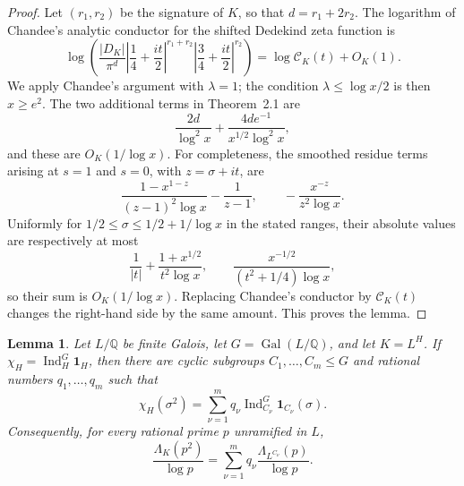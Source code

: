 \documentclass[twoside,reqno,11pt,a4paper]{amsart}
\numberwithin{equation}{section}
\theoremstyle{plain}
\newtheorem{lem}[thm]{Lemma}
\theoremstyle{definition}
\theoremstyle{remark}
\DeclareMathOperator{\Gal}{Gal}
\renewcommand{\le}{\leqslant}
\renewcommand{\ge}{\geqslant}
\begin{document}
\begin{proof}
Let $(r_1,r_2)$ be the signature of $K$, so that $d=r_1+2r_2$.  The logarithm of Chandee's analytic conductor for the shifted Dedekind zeta function is
\begin{equation*}
\log\left(\frac{|D_K|}{\pi^d}
\left|\frac14+\frac{it}{2}\right|^{r_1+r_2}
\left|\frac34+\frac{it}{2}\right|^{r_2}\right)
=\log\mathcal C_K(t)+O_K(1).
\end{equation*}
We apply Chandee's argument \cite[Theorem~2.1 and Section~3]{Chandee} with $\lambda=1$; the condition $\lambda\le\log x/2$ is then $x\ge e^2$.  The two additional terms in Theorem~2.1 are
\begin{equation*}
\frac{2d}{\log^2x}+\frac{4de^{-1}}{x^{1/2}\log^2x},
\end{equation*}
and these are $O_K(1/\log x)$.  For completeness, the smoothed residue terms arising at $s=1$ and $s=0$, with $z=\sigma+it$, are
\begin{equation*}
\frac{1-x^{1-z}}{(z-1)^2\log x}-\frac1{z-1},
\qquad -\frac{x^{-z}}{z^2\log x}.
\end{equation*}
Uniformly for $1/2\le\sigma\le1/2+1/\log x$ in the stated ranges, their absolute values are respectively at most
\begin{equation*}
\frac1{|t|}+\frac{1+x^{1/2}}{t^2\log x},
\qquad \frac{x^{-1/2}}{(t^2+1/4)\log x},
\end{equation*}
so their sum is $O_K(1/\log x)$.  Replacing Chandee's conductor by $\mathcal C_K(t)$ changes the right-hand side by the same amount.  This proves the lemma.
\end{proof}
\begin{lem}\label{artin-square-coefficients}
Let $L/\mathbb Q$ be finite Galois, let $G=\Gal(L/\mathbb Q)$, and let $K=L^H$.  If $\chi_H=\operatorname{Ind}_H^G\mathbf 1_H$, then there are cyclic subgroups $C_1,\ldots,C_m\le G$ and rational numbers $q_1,\ldots,q_m$ such that
\begin{equation}\label{eq:artin-square-decomposition}
\chi_H(\sigma^2)
=\sum_{\nu=1}^m q_\nu
\operatorname{Ind}_{C_\nu}^G\mathbf 1_{C_\nu}(\sigma).
\end{equation}
Consequently, for every rational prime $p$ unramified in $L$,
\begin{equation}\label{eq:artin-square-prime}
\frac{\Lambda_K(p^2)}{\log p}
=\sum_{\nu=1}^m q_\nu
\frac{\Lambda_{L^{C_\nu}}(p)}{\log p}.
\end{equation}
\end{lem}
\end{document}
